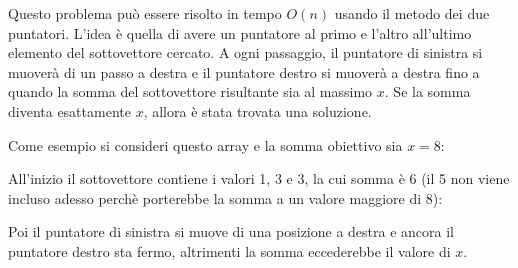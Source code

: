 Questo problema può essere risolto in tempo
$O(n)$ usando il metodo dei due puntatori.
L'idea è quella di avere un puntatore al primo e 
l'altro all'ultimo elemento del sottovettore cercato.
A ogni passaggio, il puntatore di sinistra si muoverà 
di un passo a destra e il puntatore destro si muoverà a destra
fino a quando la somma del sottovettore risultante sia al massimo $x$.
Se la somma diventa esattamente $x$,
allora è stata trovata una soluzione.

Come esempio si consideri questo array e 
la somma obiettivo sia $x=8$:
\begin{center}
\end{center}

All'inizio il sottovettore contiene i valori
1, 3 e 3, la cui somma è 6 (il 5 non viene incluso adesso
perchè porterebbe la somma a un valore maggiore di 8):

\begin{center}
\end{center}

Poi il puntatore di sinistra si muove di una posizione a destra
e ancora il puntatore destro sta fermo, altrimenti la somma
eccederebbe il valore di $x$.

\begin{center}
\end{center}

